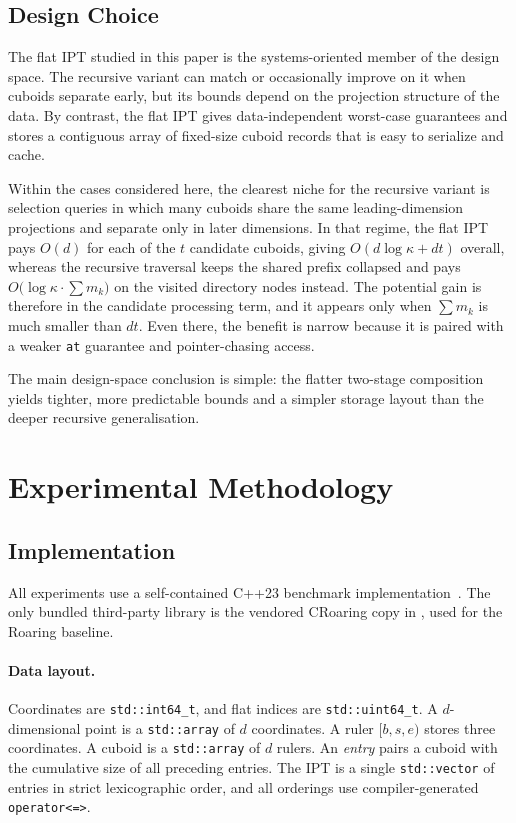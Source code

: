 \documentclass[manuscript,screen,review]{acmart}
\theoremstyle{definition}
\theoremstyle{plain}
\begin{document}
\subsection{Design Choice}

The flat IPT studied in this paper is the systems-oriented member of
the design space. The recursive variant can match or occasionally
improve on it when cuboids separate early, but its bounds depend on
the projection structure of the data. By contrast, the flat IPT gives
data-independent worst-case guarantees and stores a contiguous array of
fixed-size cuboid records that is easy to serialize and cache.

Within the cases considered here, the clearest niche for the recursive
variant is selection queries in which many cuboids share the same
leading-dimension projections and separate only in later dimensions.
In that regime, the flat IPT pays $O(d)$ for each of the $t$ candidate
cuboids, giving $O(d\log\kappa+dt)$ overall, whereas the recursive
traversal keeps the shared prefix collapsed and pays
$O\!\bigl(\log\kappa\cdot\sum m_k\bigr)$ on the visited directory
nodes instead. The potential gain is therefore in the candidate
processing term, and it appears only when $\sum m_k$ is much smaller
than $dt$. Even there, the benefit is narrow because it is paired with
a weaker \texttt{at} guarantee and pointer-chasing access.

The main design-space conclusion is simple: the flatter two-stage
composition yields tighter, more predictable bounds and a simpler
storage layout than the deeper recursive generalisation.

\section{Experimental Methodology}
\label{section:methodology}

\subsection{Implementation}
\label{section:implementation}

All experiments use a self-contained C++23 benchmark
implementation~\cite{RahnIPT2026}. The only bundled third-party
library is the vendored CRoaring copy in ,
used for the Roaring baseline.

\paragraph{Data layout.}
Coordinates are \texttt{std::int64\_t}, and flat indices are
\texttt{std::uint64\_t}.
A $d$-dimensional point is a \texttt{std::array} of $d$ coordinates.
A ruler $[b,s,e)$ stores three coordinates.
A cuboid is a \texttt{std::array} of $d$ rulers.
An \emph{entry} pairs a cuboid with the cumulative size of all preceding
entries.
The IPT is a single \texttt{std::vector} of entries in strict
lexicographic order, and all orderings use compiler-generated
\texttt{operator<=>}.
\end{document}
